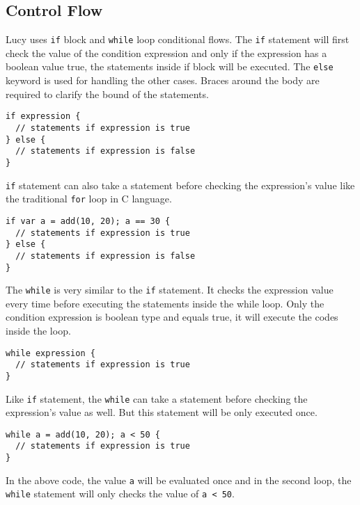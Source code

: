 \subsection{Control Flow}
Lucy uses \texttt{if} block and \texttt{while} loop conditional flows. The \texttt{if} statement will first check the value of the condition expression and only if the expression has a boolean value true, the statements inside if block will be executed. The \texttt{else} keyword is used for handling the other cases. Braces around the body are required to clarify the bound of the statements.
\begin{lstlisting}
if expression {
  // statements if expression is true
} else {
  // statements if expression is false
}
\end{lstlisting}
\texttt{if} statement can also take a statement before checking the expression's value like the traditional \texttt{for} loop in C language.
\begin{lstlisting}
if var a = add(10, 20); a == 30 {
  // statements if expression is true
} else {
  // statements if expression is false
}
\end{lstlisting}
The \texttt{while} is very similar to the \texttt{if} statement. It checks the expression value every time before executing the statements inside the while loop. Only the condition expression is boolean type and equals true, it will execute the codes inside the loop.
\begin{lstlisting}
while expression {
  // statements if expression is true
}
\end{lstlisting}
Like \texttt{if} statement, the \texttt{while} can take a statement before checking the expression's value as well. But this statement will be only executed once.
\begin{lstlisting}
while a = add(10, 20); a < 50 {
  // statements if expression is true
}
\end{lstlisting}
In the above code, the value \texttt{a} will be evaluated once and in the second loop, the \texttt{while} statement will only checks the value of \texttt{a < 50}.

